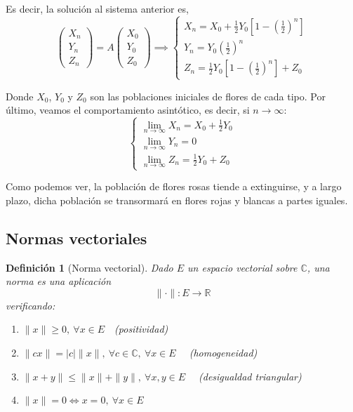 \documentclass[11pt, a4paper]{article}
\newif\IfInSansMode
\numberwithin{equation}{section}
\theoremstyle{theorem-style}
\theoremstyle{definition-style}
\newtheorem{ndef}{Definición}[section]
\theoremstyle{remark-style}
\theoremstyle{example-style}
\newenvironment{nlist}
{\begin{enumerate}
    \renewcommand\labelenumi{(\emph{\roman{enumi})}}}
  {\end{enumerate}}
\begin{document}
Es decir, la solución al sistema anterior es,
$$ \begin{pmatrix}
	X_n\\
	Y_n\\
	Z_n
\end{pmatrix} = A 
\begin{pmatrix}
	X_0\\
	Y_0\\
	Z_0
\end{pmatrix} \implies
\begin{cases}
  X_n = X_0 + \frac{1}{2} Y_0 \left[ 1 - \left( \frac{1}{2} \right)^n
  \right]\\
  Y_n = Y_0 \left( \frac{1}{2} \right)^n \\
  Z_n = \frac{1}{2} Y_0 \left[ 1 - \left( \frac{1}{2} \right)^n
  \right]
  + Z_0
\end{cases}$$

Donde $X_0$, $Y_0$ y $Z_0$ son las poblaciones iniciales de flores de cada tipo. Por último, veamos el comportamiento asintótico, es decir, si $n\to\infty$:
$$\begin{cases}
\underset{n\to\infty }{\lim} X_n = X_0 + \frac{1}{2}Y_0\\
\underset{n\to\infty }{\lim}Y_n = 0\\
\underset{n\to\infty }{\lim}Z_n = \frac{1}{2}Y_0 + Z_0	
\end{cases}$$

Como podemos ver, la población de flores rosas tiende a extinguirse, y a largo plazo, dicha población se transormará en flores rojas y blancas a partes iguales.

\subsection{Normas vectoriales}

\begin{ndef}[Norma vectorial]
Dado $E$ un espacio vectorial sobre $\mathbb C$, una \textit{norma} es una aplicación $$\|\cdot\|: E \longrightarrow \mathbb{R}$$
verificando:
\begin{nlist}
	\item $\|x\| \ge 0, \ \forall x \in E\quad$(positividad)
	\item $\|cx\| = |c|\|x\|, \ \forall c \in \mathbb{C},\ \forall x \in E\quad$ (homogeneidad)
	\item $\|x + y \| \le \|x\| + \|y\|, \ \forall x,y \in E\quad$ (desigualdad triangular)
	\item $\|x\| = 0 \iff x = 0,\ \forall x \in E$
	
\end{nlist}	
\end{ndef}
\end{document}

